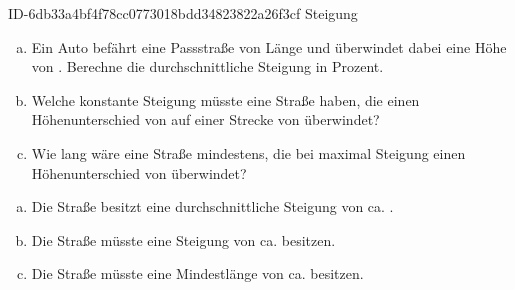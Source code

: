\begin{exercise}
      {ID-6db33a4bf4f78cc0773018bdd34823822a26f3cf}
      {Steigung}
  \ifproblem\problem
    \begin{enumerate}[a)]
      \item Ein Auto befährt eine Passstraße von  Länge und überwindet
            dabei eine Höhe von . Berechne die durchschnittliche
            Steigung in Prozent.
      \item Welche konstante Steigung müsste eine Straße haben, die einen
            Höhenunterschied von  auf einer Strecke von
             überwindet?
      \item Wie lang wäre eine Straße mindestens, die bei maximal 
            Steigung einen Höhenunterschied von  überwindet?
    \end{enumerate}
  \fi
  \ifoutline\outline
  \fi
  \ifoutcome\outcome
    \begin{enumerate}[a)]
      \item Die Straße besitzt eine durchschnittliche Steigung von ca. .
      \item Die Straße müsste eine Steigung von ca.  besitzen.
      \item Die Straße müsste eine Mindestlänge von ca.  besitzen.
    \end{enumerate}
  \fi
\end{exercise}
